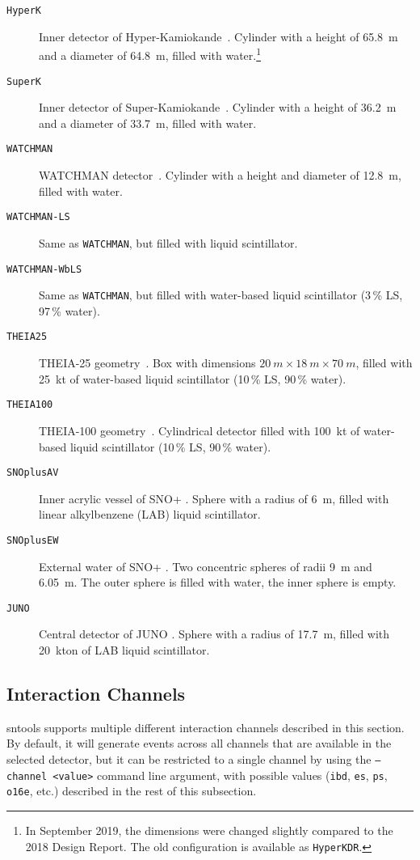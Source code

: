\documentclass[11pt, oneside]{article}
\begin{document}
\begin{description}
\item[\texttt{HyperK}] Inner detector of Hyper-Kamiokande~\cite{HKDR2018}. Cylinder with a height of \SI{65.8}{m} and a diameter of \SI{64.8}{m}, filled with water.\footnote{In September 2019, the dimensions were changed slightly compared to the 2018 Design Report. The old configuration is available as \texttt{HyperKDR}.}
\item[\texttt{SuperK}] Inner detector of Super-Kamiokande~\cite{Fukuda2003}. Cylinder with a height of \SI{36.2}{m} and a diameter of \SI{33.7}{m}, filled with water.
\item[\texttt{WATCHMAN}] WATCHMAN detector~\cite{Askins2015}. Cylinder with a height and diameter of \SI{12.8}{m}, filled with water.
\item[\texttt{WATCHMAN-LS}] Same as \texttt{WATCHMAN}, but filled with liquid scintillator.
\item[\texttt{WATCHMAN-WbLS}] Same as \texttt{WATCHMAN}, but filled with water-based liquid scintillator (3\,\% LS, 97\,\% water).
\item[\texttt{THEIA25}] THEIA-25 geometry~\cite{Askins2020}. Box with dimensions $\SI{20}{m}\times\SI{18}{m}\times\SI{70}{m}$, filled with \SI{25}{kt} of water-based liquid scintillator (10\,\% LS, 90\,\% water).
\item[\texttt{THEIA100}] THEIA-100 geometry~\cite{Askins2020}. Cylindrical detector filled with \SI{100}{kt} of water-based liquid scintillator (10\,\% LS, 90\,\% water).
\item[\texttt{SNOplusAV}] Inner acrylic vessel of SNO+ \cite{albanese2021sno+}. Sphere with a radius of \SI{6}{m}, filled with linear alkylbenzene (LAB) liquid scintillator.
\item[\texttt{SNOplusEW}] External water of SNO+ \cite{albanese2021sno+}. Two concentric spheres of radii \SI{9}{m} and \SI{6.05}{m}. The outer sphere is filled with water, the inner sphere is empty.
\item[\texttt{JUNO}] Central detector of JUNO \cite{JUNO:2021vlw}. Sphere with a radius of \SI{17.7}{m}, filled with \SI{20}{kton} of LAB liquid scintillator.
\end{description}


\subsection{Interaction Channels} \label{sec:interaction-channels}
sntools supports multiple different interaction channels described in this section.
By default, it will generate events across all channels that are available in the selected detector, but it can be restricted to a single channel by using the \texttt{--channel <value>} command line argument, with possible values (\texttt{ibd}, \texttt{es}, \texttt{ps}, \texttt{o16e}, etc.) described in the rest of this subsection.
\end{document}
